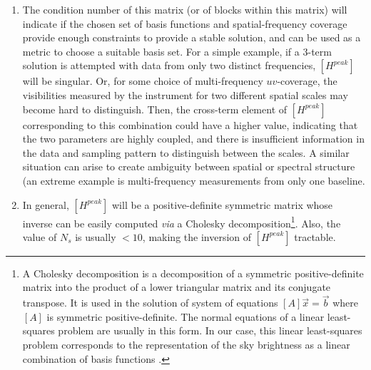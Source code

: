 \documentclass[structabstract]{stylefiles/aa}
\begin{document}
\begin{enumerate}
\item The condition number of this matrix (or of blocks within this matrix)
will indicate if the chosen set of basis functions and spatial-frequency coverage 
provide enough constraints to provide a stable solution, and 
can be used as a metric to choose a suitable basis set.
For a simple example, if a 3-term solution is attempted with data from only two distinct
frequencies, $[H^{peak}]$ will be singular.
Or, for some choice of multi-frequency $uv$-coverage, the visibilities
measured by the instrument for two different spatial scales may become hard to distinguish. 
Then, the cross-term element of $[H^{peak}]$ corresponding to
this combination could have a higher value, indicating that the two parameters are highly coupled,
and there is insufficient information in the data and sampling pattern to distinguish 
between the scales. A similar situation can arise to create ambiguity between 
spatial or spectral structure (an extreme example is multi-frequency measurements from only
one baseline.
\item In general, $[H^{peak}]$ will be a positive-definite 
symmetric matrix whose inverse can be easily computed {\it via} a 
Cholesky decomposition\footnote
{A Cholesky decomposition is a decomposition of a symmetric positive-definite matrix
into the product of a lower triangular matrix and its conjugate transpose. 
It is used in the solution of system of equations $[A]\vec{x}=\vec{b}$ where
$[A]$ is symmetric positive-definite. 
The normal equations of a linear least-squares problem are usually in this form. 
In our case, this linear least-squares problem corresponds to the 
representation of the sky brightness as a linear combination of basis functions
\citep{NR}.
}.  
Also, the value of $N_s$ is usually $< 10 $, making the inversion 
of $[H^{peak}]$ tractable. 


\end{enumerate}
\end{document}
